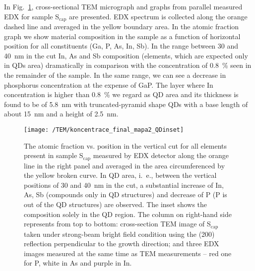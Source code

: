 In Fig.~\ref{fig:TEM}, cross-sectional TEM micrograph and graphs from parallel measured EDX for sample S$_\mathrm{cap}$ are presented. EDX spectrum is collected along the orange dashed line and averaged in the yellow boundary area. In the atomic fraction graph we show material composition in the sample as a function of horizontal position for all constituents (Ga, P, As, In, Sb). In the range between 30 and 40~nm in the cut In, As and Sb composition (elements, which are expected only in QDs area) dramatically in comparison with the concentration of 0.8~\% seen in the remainder of the sample. In the same range, we can see a decrease in phosphorus concentration at the expense of GaP. The layer where In concentration is higher than 0.8~\% we regard as QD area and its thickness is found to be of 5.8~nm with truncated-pyramid shape QDs with a base length of about 15~nm and a height of 2.5~nm. 
\begin{figure}
	\centering
	\texttt{[image: /TEM/koncentrace\_final\_mapa2\_QDinset]}
	\caption{The atomic fraction vs. position in the vertical cut for all elements present in sample S$_\mathrm{cap}$ measured by EDX detector along the orange line in the right panel and averaged in the area circumferenced by the yellow broken curve. In QD area, i.~e., between the vertical positions of 30 and 40~nm in the cut, a substantial increase of In, As, Sb (compounds only in QD structures) and decrease of P (P is out of the QD structures) are observed. The inset shows the composition solely in the QD region. The column on right-hand side represents from top to bottom: cross-section TEM image of S$_\mathrm{cap}$ taken under strong-beam bright field condition using the (200) reflection perpendicular to the growth direction; and three EDX images measured at the same time as TEM measurements -- red one for P, white in As and purple in In.}
	\label{fig:TEM}
\end{figure}

